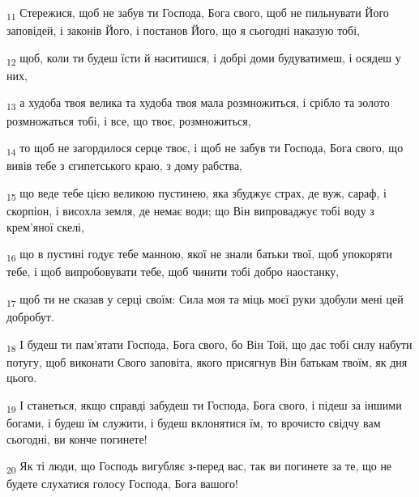 \begin{tcolorbox}
\textsubscript{11} Стережися, щоб не забув ти Господа, Бога свого, щоб не пильнувати Його заповідей, і законів Його, і постанов Його, що я сьогодні наказую тобі,
\end{tcolorbox}
\begin{tcolorbox}
\textsubscript{12} щоб, коли ти будеш їсти й наситишся, і добрі доми будуватимеш, і осядеш у них,
\end{tcolorbox}
\begin{tcolorbox}
\textsubscript{13} а худоба твоя велика та худоба твоя мала розмножиться, і срібло та золото розмножаться тобі, і все, що твоє, розмножиться,
\end{tcolorbox}
\begin{tcolorbox}
\textsubscript{14} то щоб не загордилося серце твоє, і щоб не забув ти Господа, Бога свого, що вивів тебе з єгипетського краю, з дому рабства,
\end{tcolorbox}
\begin{tcolorbox}
\textsubscript{15} що веде тебе цією великою пустинею, яка збуджує страх, де вуж, сараф, і скорпіон, і висохла земля, де немає води; що Він випроваджує тобі воду з крем'яної скелі,
\end{tcolorbox}
\begin{tcolorbox}
\textsubscript{16} що в пустині годує тебе манною, якої не знали батьки твої, щоб упокоряти тебе, і щоб випробовувати тебе, щоб чинити тобі добро наостанку,
\end{tcolorbox}
\begin{tcolorbox}
\textsubscript{17} щоб ти не сказав у серці своїм: Сила моя та міць моєї руки здобули мені цей добробут.
\end{tcolorbox}
\begin{tcolorbox}
\textsubscript{18} І будеш ти пам'ятати Господа, Бога свого, бо Він Той, що дає тобі силу набути потугу, щоб виконати Свого заповіта, якого присягнув Він батькам твоїм, як дня цього.
\end{tcolorbox}
\begin{tcolorbox}
\textsubscript{19} І станеться, якщо справді забудеш ти Господа, Бога свого, і підеш за іншими богами, і будеш їм служити, і будеш вклонятися їм, то врочисто свідчу вам сьогодні, ви конче погинете!
\end{tcolorbox}
\begin{tcolorbox}
\textsubscript{20} Як ті люди, що Господь вигубляє з-перед вас, так ви погинете за те, що не будете слухатися голосу Господа, Бога вашого!
\end{tcolorbox}
